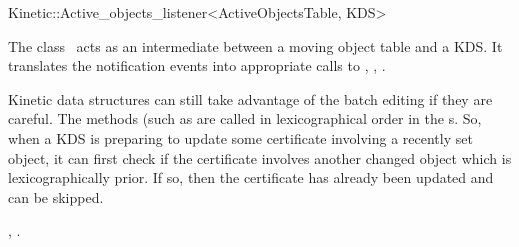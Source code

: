 

\begin{ccRefClass}{Kinetic::Active_objects_listener<ActiveObjectsTable, KDS>}  %


\ccDefinition
  
The class \ccRefName\ acts as an intermediate between a moving object
table and a KDS. It translates the
 notification events into
appropriate calls to , ,
. 

Kinetic data structures can still take advantage of the batch editing
if they are careful. The methods (such as  are
called in lexicographical order in the s. So, when a KDS is
preparing to update some certificate involving a recently set object,
it can first check if the certificate involves another changed object
which is lexicographically prior. If so, then the certificate has
already been updated and can be skipped.



\ccSeeAlso

,
.


\end{ccRefClass}


